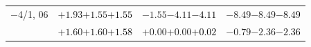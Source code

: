 \documentclass[compress]{beamer}
\begin{document}
\begin{frame}
\begin{tabular}{r | c | c | c}
$-$4/1, 06 & $+1.93$\hspace{0.1 cm}$+1.55$\hspace{0.1 cm}\textcolor{black}{$+1.55$} & $-1.55$\hspace{0.1 cm}$-4.11$\hspace{0.1 cm}\textcolor{black}{$-4.11$} & $-8.49$\hspace{0.1 cm}$-8.49$\hspace{0.1 cm}\textcolor{black}{$-8.49$} \\
           & $+1.60$\hspace{0.1 cm}$+1.60$\hspace{0.1 cm}\textcolor{black}{$+1.58$} & $+0.00$\hspace{0.1 cm}$+0.00$\hspace{0.1 cm}\textcolor{black}{$+0.02$} & $-0.79$\hspace{0.1 cm}$-2.36$\hspace{0.1 cm}\textcolor{black}{$-2.36$} \\
\end{tabular}
\end{frame}
\end{document}
